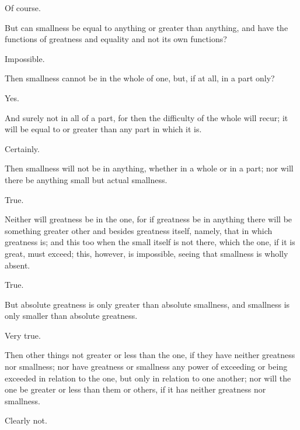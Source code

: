 \documentclass[11pt,letter]{article}
\begin{document}
\par  Of course.

\par  But can smallness be equal to anything or greater than anything, and have the functions of greatness and equality and not its own functions?

\par  Impossible.

\par  Then smallness cannot be in the whole of one, but, if at all, in a part only?

\par  Yes.

\par  And surely not in all of a part, for then the difficulty of the whole will recur; it will be equal to or greater than any part in which it is.

\par  Certainly.

\par  Then smallness will not be in anything, whether in a whole or in a part; nor will there be anything small but actual smallness.

\par  True.

\par  Neither will greatness be in the one, for if greatness be in anything there will be something greater other and besides greatness itself, namely, that in which greatness is; and this too when the small itself is not there, which the one, if it is great, must exceed; this, however, is impossible, seeing that smallness is wholly absent.

\par  True.

\par  But absolute greatness is only greater than absolute smallness, and smallness is only smaller than absolute greatness.

\par  Very true.

\par  Then other things not greater or less than the one, if they have neither greatness nor smallness; nor have greatness or smallness any power of exceeding or being exceeded in relation to the one, but only in relation to one another; nor will the one be greater or less than them or others, if it has neither greatness nor smallness.

\par  Clearly not.
\end{document}
